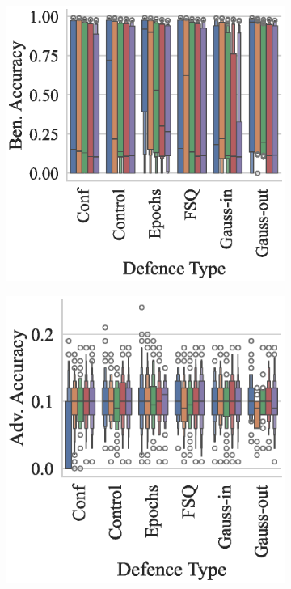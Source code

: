 \begin{figure}
\begin{subfigure}[]{0.27\textwidth}
    \centering
    \includegraphics[width=\textwidth]{mnist_ben_accuracy_vs_defence_type.eps}
\end{subfigure}
\begin{subfigure}[]{0.27\textwidth}
    \centering
    \includegraphics[width=\textwidth]{mnist_adv_accuracy_vs_defence_type.eps}

\end{subfigure}
\end{figure}
